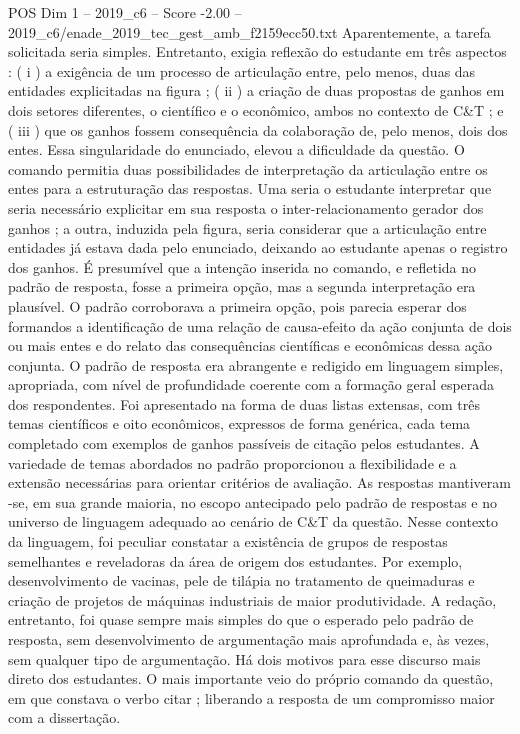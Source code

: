 \begin{textsample}{POS Dim 1 – 2019\_c6 – Score -2.00 – 2019\_c6/enade\_2019\_tec\_gest\_amb\_f2159ecc50.txt}
Aparentemente, a tarefa solicitada seria simples.
Entretanto, exigia reflexão do estudante em três aspectos : ( i ) a exigência de um processo de articulação entre, pelo menos, duas das entidades explicitadas na figura ; ( ii ) a criação de duas propostas de ganhos em dois setores diferentes, o científico e o econômico, ambos no contexto de C\&T ; e ( iii ) que os ganhos fossem consequência da colaboração de, pelo menos, dois dos entes.
Essa singularidade do enunciado, elevou a dificuldade da questão.
O comando permitia duas possibilidades de interpretação da articulação entre os entes para a estruturação das respostas.
Uma seria o estudante interpretar que seria necessário explicitar em sua resposta o inter-relacionamento gerador dos ganhos ; a outra, induzida pela figura, seria considerar que a articulação entre entidades já estava dada pelo enunciado, deixando ao estudante apenas o registro dos ganhos.
É presumível que a intenção inserida no comando, e refletida no padrão de resposta, fosse a primeira opção, mas a segunda interpretação era plausível.
O padrão corroborava a primeira opção, pois parecia esperar dos formandos a identificação de uma relação de causa-efeito da ação conjunta de dois ou mais entes e do relato das consequências científicas e econômicas dessa ação conjunta.
O padrão de resposta era abrangente e redigido em linguagem simples, apropriada, com nível de profundidade coerente com a formação geral esperada dos respondentes.
Foi apresentado na forma de duas listas extensas, com três temas científicos e oito econômicos, expressos de forma genérica, cada tema completado com exemplos de ganhos passíveis de citação pelos estudantes.
A variedade de temas abordados no padrão proporcionou a flexibilidade e a extensão necessárias para orientar critérios de avaliação.
As respostas mantiveram -se, em sua grande maioria, no escopo antecipado pelo padrão de respostas e no universo de linguagem adequado ao cenário de C\&T da questão.
Nesse contexto da linguagem, foi peculiar constatar a existência de grupos de respostas semelhantes e reveladoras da área de origem dos estudantes.
Por exemplo, desenvolvimento de vacinas, pele de tilápia no tratamento de queimaduras e criação de projetos de máquinas industriais de maior produtividade.
A redação, entretanto, foi quase sempre mais simples do que o esperado pelo padrão de resposta, sem desenvolvimento de argumentação mais aprofundada e, às vezes, sem qualquer tipo de argumentação.
Há dois motivos para esse discurso mais direto dos estudantes.
O mais importante veio do próprio comando da questão, em que constava o verbo citar ; liberando a resposta de um compromisso maior com a dissertação.

\end{textsample}
